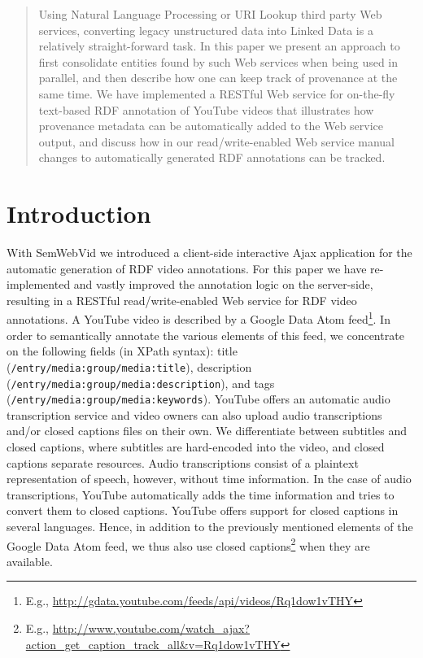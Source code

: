 \documentclass{acm_proc_article-sp}
\begin{document}
\maketitle
\begin{abstract}
Using Natural Language Processing or URI Lookup third party Web services, converting legacy unstructured data into Linked Data is a relatively straight-forward task. In this paper we present an approach to first consolidate entities found by such Web services when being used in parallel, and then describe how one can keep track of provenance at the same time. We have implemented a RESTful Web service for on-the-fly text-based RDF annotation of YouTube videos that illustrates how provenance metadata can be automatically added to the Web service output, and discuss how in our read/write-enabled Web service manual changes to automatically generated RDF annotations can be tracked. 
\end{abstract}




\section{Introduction}\label{sec:introduction}
With SemWebVid \cite{Steiner:SemWebVid} we introduced a client-side interactive Ajax application for the automatic generation of RDF video annotations. For this paper we have re-implemented and vastly improved the annotation logic on the server-side, resulting in a RESTful read/write-enabled Web service for RDF video annotations. A YouTube video is described by a Google Data Atom feed\footnote{E.g., \url{http://gdata.youtube.com/feeds/api/videos/Rq1dow1vTHY}}. In order to semantically annotate the various elements of this feed, we concentrate on the following fields (in XPath syntax): title (\texttt{/entry/media:group/media:title}), description (\texttt{/entry/media:group/media:description}), and tags (\texttt{/entry/media:group/media:keywords}). YouTube offers an automatic audio transcription service and video owners can also upload audio transcriptions and/or closed captions files on their own. We differentiate between subtitles and closed captions, where subtitles are hard-encoded into the video, and closed captions separate resources. Audio transcriptions consist of a plaintext representation of speech, however, without time information. In the case of audio transcriptions, YouTube automatically adds the time information and tries to convert them to closed captions. YouTube offers support for closed captions in several languages. Hence, in addition to the previously mentioned elements of the Google Data Atom feed, we thus also use closed captions\footnote{E.g., \url{http://www.youtube.com/watch_ajax?action_get_caption_track_all&v=Rq1dow1vTHY}} when they are available.
\end{document}
